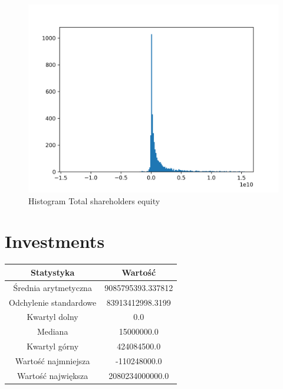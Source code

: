\documentclass{article}
\begin{document}
\begin{figure}[h!]
    \includegraphics[width=\linewidth]{variables/Total shareholders equity.png}
    \caption{Histogram Total shareholders equity }
\end{figure}\section{ Investments }

\begin{center}
    \begin{tabular}{|c | c|} 
    \hline
    Statystyka & Wartość \\
    \hline\hline
    Średnia arytmetyczna & 9085795393.337812 \\ 
    \hline
    Odchylenie standardowe & 83913412998.3199 \\
    \hline
    Kwartyl dolny & 0.0 \\
    \hline
    Mediana & 15000000.0 \\
    \hline
    Kwartyl górny & 424084500.0 \\
    \hline
    Wartość najmniejsza & -110248000.0 \\
    \hline
    Wartość największa & 2080234000000.0 \\
    \hline
   \end{tabular}
\end{center}
\end{document}
